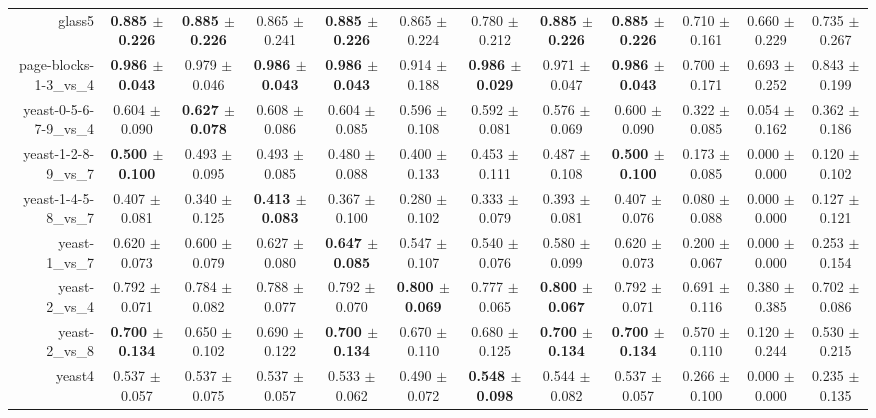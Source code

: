 \begin{table}[!ht]
{\begin{tabular}{r c c c c c c c c c c c}
glass5 & \textbf{0.885 $\pm$ 0.226} & \textbf{0.885 $\pm$ 0.226} & 0.865 $\pm$ 0.241 & \textbf{0.885 $\pm$ 0.226} & 0.865 $\pm$ 0.224 & 0.780 $\pm$ 0.212 & \textbf{0.885 $\pm$ 0.226} & \textbf{0.885 $\pm$ 0.226} & 0.710 $\pm$ 0.161 & 0.660 $\pm$ 0.229 & 0.735 $\pm$ 0.267 \\
page-blocks-1-3\_vs\_4 & \textbf{0.986 $\pm$ 0.043} & 0.979 $\pm$ 0.046 & \textbf{0.986 $\pm$ 0.043} & \textbf{0.986 $\pm$ 0.043} & 0.914 $\pm$ 0.188 & \textbf{0.986 $\pm$ 0.029} & 0.971 $\pm$ 0.047 & \textbf{0.986 $\pm$ 0.043} & 0.700 $\pm$ 0.171 & 0.693 $\pm$ 0.252 & 0.843 $\pm$ 0.199 \\
yeast-0-5-6-7-9\_vs\_4 & 0.604 $\pm$ 0.090 & \textbf{0.627 $\pm$ 0.078} & 0.608 $\pm$ 0.086 & 0.604 $\pm$ 0.085 & 0.596 $\pm$ 0.108 & 0.592 $\pm$ 0.081 & 0.576 $\pm$ 0.069 & 0.600 $\pm$ 0.090 & 0.322 $\pm$ 0.085 & 0.054 $\pm$ 0.162 & 0.362 $\pm$ 0.186 \\
yeast-1-2-8-9\_vs\_7 & \textbf{0.500 $\pm$ 0.100} & 0.493 $\pm$ 0.095 & 0.493 $\pm$ 0.085 & 0.480 $\pm$ 0.088 & 0.400 $\pm$ 0.133 & 0.453 $\pm$ 0.111 & 0.487 $\pm$ 0.108 & \textbf{0.500 $\pm$ 0.100} & 0.173 $\pm$ 0.085 & 0.000 $\pm$ 0.000 & 0.120 $\pm$ 0.102 \\
yeast-1-4-5-8\_vs\_7 & 0.407 $\pm$ 0.081 & 0.340 $\pm$ 0.125 & \textbf{0.413 $\pm$ 0.083} & 0.367 $\pm$ 0.100 & 0.280 $\pm$ 0.102 & 0.333 $\pm$ 0.079 & 0.393 $\pm$ 0.081 & 0.407 $\pm$ 0.076 & 0.080 $\pm$ 0.088 & 0.000 $\pm$ 0.000 & 0.127 $\pm$ 0.121 \\
yeast-1\_vs\_7 & 0.620 $\pm$ 0.073 & 0.600 $\pm$ 0.079 & 0.627 $\pm$ 0.080 & \textbf{0.647 $\pm$ 0.085} & 0.547 $\pm$ 0.107 & 0.540 $\pm$ 0.076 & 0.580 $\pm$ 0.099 & 0.620 $\pm$ 0.073 & 0.200 $\pm$ 0.067 & 0.000 $\pm$ 0.000 & 0.253 $\pm$ 0.154 \\
yeast-2\_vs\_4 & 0.792 $\pm$ 0.071 & 0.784 $\pm$ 0.082 & 0.788 $\pm$ 0.077 & 0.792 $\pm$ 0.070 & \textbf{0.800 $\pm$ 0.069} & 0.777 $\pm$ 0.065 & \textbf{0.800 $\pm$ 0.067} & 0.792 $\pm$ 0.071 & 0.691 $\pm$ 0.116 & 0.380 $\pm$ 0.385 & 0.702 $\pm$ 0.086 \\
yeast-2\_vs\_8 & \textbf{0.700 $\pm$ 0.134} & 0.650 $\pm$ 0.102 & 0.690 $\pm$ 0.122 & \textbf{0.700 $\pm$ 0.134} & 0.670 $\pm$ 0.110 & 0.680 $\pm$ 0.125 & \textbf{0.700 $\pm$ 0.134} & \textbf{0.700 $\pm$ 0.134} & 0.570 $\pm$ 0.110 & 0.120 $\pm$ 0.244 & 0.530 $\pm$ 0.215 \\
yeast4 & 0.537 $\pm$ 0.057 & 0.537 $\pm$ 0.075 & 0.537 $\pm$ 0.057 & 0.533 $\pm$ 0.062 & 0.490 $\pm$ 0.072 & \textbf{0.548 $\pm$ 0.098} & 0.544 $\pm$ 0.082 & 0.537 $\pm$ 0.057 & 0.266 $\pm$ 0.100 & 0.000 $\pm$ 0.000 & 0.235 $\pm$ 0.135 \\

\end{tabular}}
\end{table}
